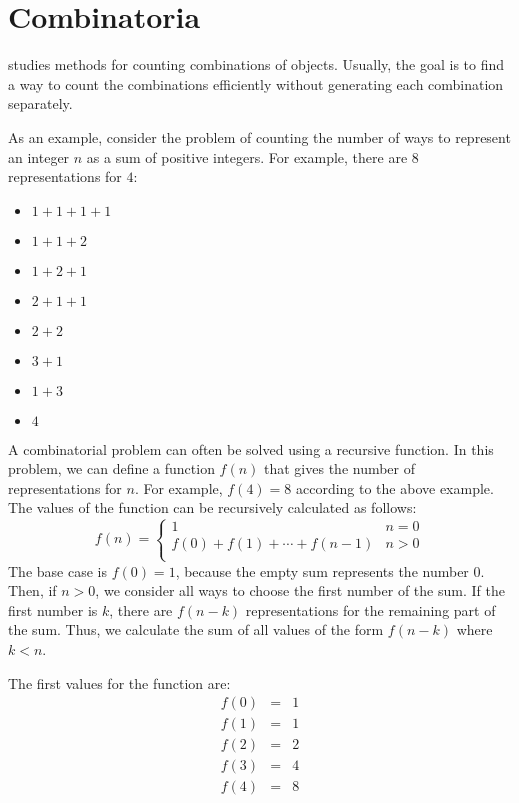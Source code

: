 \chapter{Combinatoria}


 studies methods for counting
combinations of objects.
Usually, the goal is to find a way to
count the combinations efficiently
without generating each combination separately.

As an example, consider the problem
of counting the number of ways to
represent an integer $n$ as a sum of positive integers.
For example, there are 8 representations
for $4$:
\begin{multicols}{2}
    \begin{itemize}
        \item $1+1+1+1$
        \item $1+1+2$
        \item $1+2+1$
        \item $2+1+1$
        \item $2+2$
        \item $3+1$
        \item $1+3$
        \item $4$
    \end{itemize}
\end{multicols}

A combinatorial problem can often be solved
using a recursive function.
In this problem, we can define a function $f(n)$
that gives the number of representations for $n$.
For example, $f(4)=8$ according to the above example.
The values of the function
can be recursively calculated as follows:
\begin{equation*}
    f(n) = \begin{cases}
        1                       & n = 0 \\
        f(0)+f(1)+\cdots+f(n-1) & n > 0 \\
    \end{cases}
\end{equation*}
The base case is $f(0)=1$,
because the empty sum represents the number 0.
Then, if $n>0$, we consider all ways to
choose the first number of the sum.
If the first number is $k$,
there are $f(n-k)$ representations
for the remaining part of the sum.
Thus, we calculate the sum of all values
of the form $f(n-k)$ where $k<n$.

The first values for the function are:
\[
    \begin{array}{lcl}
        f(0) & = & 1 \\
        f(1) & = & 1 \\
        f(2) & = & 2 \\
        f(3) & = & 4 \\
        f(4) & = & 8 \\
    \end{array}
\]

